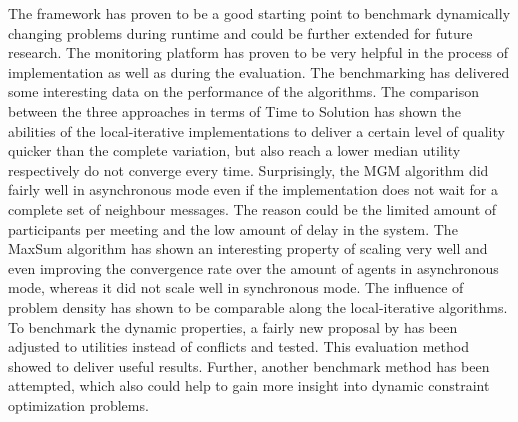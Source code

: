 The framework has proven to be a good starting point to benchmark dynamically changing problems during runtime and could be further extended for future research. The monitoring platform has proven to be very helpful in the process of implementation as well as during the evaluation. The benchmarking has delivered some interesting data on the performance of the algorithms. The comparison between the three approaches in terms of Time to Solution has shown the abilities of the local-iterative implementations to deliver a certain level of quality quicker than the complete variation, but also reach a lower median utility respectively do not converge every time. Surprisingly, the MGM algorithm did fairly well in asynchronous mode even if the implementation does not wait for a complete set of neighbour messages. The reason could be the limited amount of participants per meeting and the low amount of delay in the system. The MaxSum algorithm has shown an interesting property of scaling very well and even improving the convergence rate over the amount of agents in asynchronous mode, whereas it did not scale well in synchronous mode. The influence of problem density has shown to be comparable along the local-iterative algorithms. To benchmark the dynamic properties, a fairly new proposal by \cite{Maillera} has been adjusted to utilities instead of conflicts and tested. This evaluation method showed to deliver useful results. Further, another benchmark method has been attempted, which also could help to gain more insight into dynamic constraint optimization problems.

